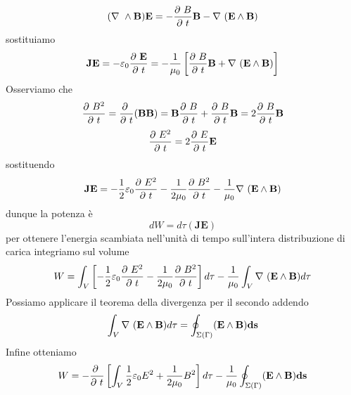 \documentclass[
10pt, %
a4paper, %
oneside, %
headinclude,footinclude, %
BCOR5mm, %
]{scrartcl}
\begin{document}
\[(\nabla\ \wedge\mathbf{B})\mathbf{E} = -\frac{\partial\  B}{\partial\  t}\mathbf{B}- \nabla\ (\mathbf{E}\wedge\mathbf{B})\]
sostituiamo
\[\mathbf{J}\mathbf{E} = -\varepsilon_0 \frac{\partial\  \mathbf{E}}{\partial\  t} = -\frac{1}{\mu_0}\left[\frac{\partial\  B}{\partial\  t}\mathbf{B}+\nabla\ (\mathbf{E\wedge\mathbf{B}})\right]\]
Osserviamo che 
\[\frac{\partial\  B^2}{\partial\  t} = \frac{\partial\  }{\partial\  t}(\mathbf{B}\mathbf{B}) = \mathbf{B}\frac{\partial\  B}{\partial\  t}+\frac{\partial\  B}{\partial\  t}\mathbf{B}=2\frac{\partial\  B}{\partial\  t}\mathbf{B}\]
\[\frac{\partial\  E^2}{\partial\  t} = 2\frac{\partial\  E}{\partial\  t}\mathbf{E}\]
sostituendo
\[\mathbf{J}\mathbf{E} = -\frac{1}{2}\varepsilon_0\frac{\partial\  E^2}{\partial\  t}-\frac{1}{2\mu_0}\frac{\partial\  B^2}{\partial\  t}-\frac{1}{\mu_0}\nabla\ (\mathbf{E}\wedge\mathbf{B})\]
dunque la potenza è
\[dW = d\tau (\mathbf{J}\mathbf{E})\]
per ottenere l'energia scambiata nell'unità di tempo sull'intera distribuzione di carica integriamo sul volume
\[W = \int_V\left[ -\frac{1}{2}\varepsilon_0\frac{\partial\  E^2}{\partial\  t}-\frac{1}{2\mu_0}\frac{\partial\  B^2}{\partial\  t} \right] d\tau-\frac{1}{\mu_0}\int_V \nabla\ (\mathbf{E}\wedge\mathbf{B})d\tau \]
Possiamo applicare il teorema della divergenza per il secondo addendo 
\[\int_V \nabla\ (\mathbf{E}\wedge\mathbf{B}) d\tau = \oint_{\Sigma(\Gamma)}(\mathbf{E}\wedge\mathbf{B})\mathbf{ds}\]
Infine otteniamo
\[W = -\frac{\partial\  }{\partial\  t}\left[\int_V \frac{1}{2}\varepsilon_0 E^2+\frac{1}{2\mu_0}B^2 \right] d\tau-\frac{1}{\mu_0}\oint_{\Sigma(\Gamma)}(\mathbf{E}\wedge\mathbf{B})\mathbf{ds}\]
\end{document}
